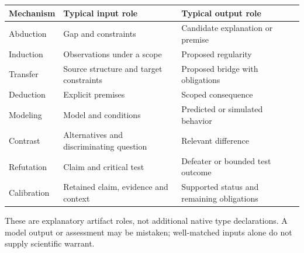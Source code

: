 \begin{center}
\small
\begin{tabularx}{\linewidth}{@{}lXX@{}}
\toprule
Mechanism & Typical input role & Typical output role \\
\midrule
Abduction & Gap and constraints & Candidate explanation or premise \\
Induction & Observations under a scope & Proposed regularity \\
Transfer & Source structure and target constraints & Proposed bridge with obligations \\
Deduction & Explicit premises & Scoped consequence \\
Modeling & Model and conditions & Predicted or simulated behavior \\
Contrast & Alternatives and discriminating question & Relevant difference \\
Refutation & Claim and critical test & Defeater or bounded test outcome \\
Calibration & Retained claim, evidence and context & Supported status and remaining obligations \\
\bottomrule
\end{tabularx}
\end{center}
These are explanatory artifact roles, not additional native type declarations. A model output or assessment may be mistaken; well-matched inputs alone do not supply scientific warrant.
